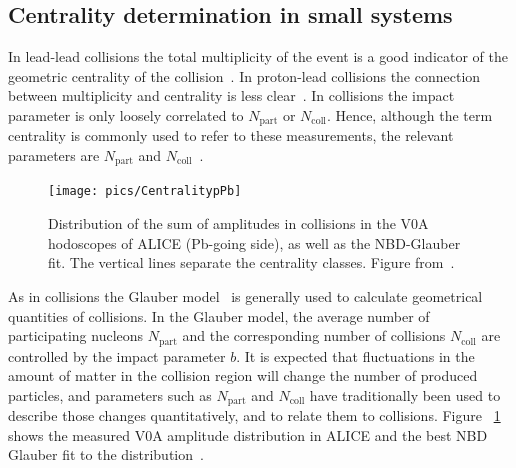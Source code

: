 \FloatBarrier
\subsection{Centrality determination in small systems}
\label{sec:smallsystemcentrality}
In lead-lead collisions the total multiplicity of the event is a good indicator of the geometric centrality of the collision~\cite{Abelev:2013qoq}. In proton-lead collisions the connection between multiplicity and centrality is less clear~\cite{Adam:2014qja}. In \pPb collisions the impact parameter is only loosely correlated to $N_\mathrm{part}$ or $N_\mathrm{coll}$. Hence, although the term centrality is commonly used to refer to these measurements, the relevant parameters are $N_\mathrm{part}$ and $N_\mathrm{coll}$~\cite{Adam:2014qja}.

\begin{figure}[b!]
\centering
            	\texttt{[image: pics/CentralitypPb]}
                \caption{Distribution of the sum of amplitudes in \pPb collisions in the V0A hodoscopes of ALICE (Pb-going side), as well
as the NBD-Glauber fit. The vertical lines separate the centrality classes. Figure from~\cite{Adam:2014qja}.}
	\label{fig:pPbcentrality}
\end{figure}




As in \PbPb collisions the Glauber model~\cite{Miller:2007ri} is generally used to calculate geometrical quantities of \pPb collisions. In the Glauber model, the average number of participating nucleons  $N_\mathrm{part}$ and the corresponding number of collisions $N_\mathrm{coll}$ are controlled by  the impact parameter $b$. It is expected that fluctuations in the amount of matter in the collision region will change the number of produced particles, and parameters such as $N_\mathrm{part}$ and $N_\mathrm{coll}$ have traditionally been used to describe those changes quantitatively, and to relate them to \pp collisions. Figure ~\ref{fig:pPbcentrality} shows the measured V0A amplitude distribution in ALICE and the best NBD Glauber fit to the distribution~\cite{Adam:2014qja}.




